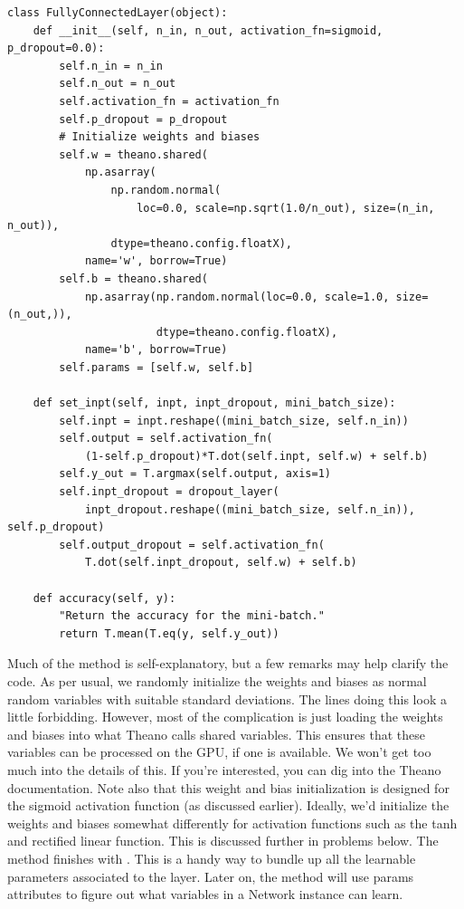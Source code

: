 \documentclass[a4paper,twoside,10pt]{book}
\begin{document}
\begin{lstlisting}
class FullyConnectedLayer(object):
    def __init__(self, n_in, n_out, activation_fn=sigmoid, p_dropout=0.0):
        self.n_in = n_in
        self.n_out = n_out
        self.activation_fn = activation_fn
        self.p_dropout = p_dropout
        # Initialize weights and biases
        self.w = theano.shared(
            np.asarray(
                np.random.normal(
                    loc=0.0, scale=np.sqrt(1.0/n_out), size=(n_in, n_out)),
                dtype=theano.config.floatX),
            name='w', borrow=True)
        self.b = theano.shared(
            np.asarray(np.random.normal(loc=0.0, scale=1.0, size=(n_out,)),
                       dtype=theano.config.floatX),
            name='b', borrow=True)
        self.params = [self.w, self.b]

    def set_inpt(self, inpt, inpt_dropout, mini_batch_size):
        self.inpt = inpt.reshape((mini_batch_size, self.n_in))
        self.output = self.activation_fn(
            (1-self.p_dropout)*T.dot(self.inpt, self.w) + self.b)
        self.y_out = T.argmax(self.output, axis=1)
        self.inpt_dropout = dropout_layer(
            inpt_dropout.reshape((mini_batch_size, self.n_in)), self.p_dropout)
        self.output_dropout = self.activation_fn(
            T.dot(self.inpt_dropout, self.w) + self.b)

    def accuracy(self, y):
        "Return the accuracy for the mini-batch."
        return T.mean(T.eq(y, self.y_out))

\end{lstlisting}
Much of the  method is self-explanatory, but a few remarks may help clarify the code. As per usual, we randomly initialize the weights and biases as normal random variables with suitable standard deviations. The lines doing this look a little forbidding. However, most of the complication is just loading the weights and biases into what Theano calls shared variables. This ensures that these variables can be processed on the GPU, if one is available. We won't get too much into the details of this. If you're interested, you can dig into the Theano documentation. Note also that this weight and bias initialization is designed for the sigmoid activation function (as discussed earlier). Ideally, we'd initialize the weights and biases somewhat differently for activation functions such as the tanh and rectified linear function. This is discussed further in problems below. The  method finishes with . This is a handy way to bundle up all the learnable parameters associated to the layer. Later on, the  method will use params attributes to figure out what variables in a Network instance can learn.
\end{document}
